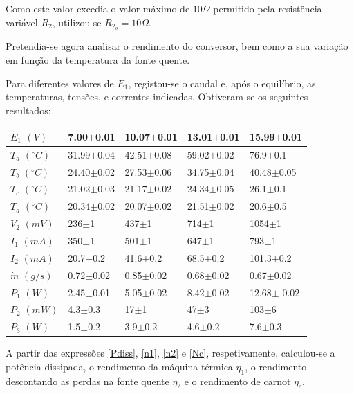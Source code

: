 \documentclass[9pt]{extarticle}
\begin{document}
\begin{multicols}{2}
\par Como este  valor excedia o valor máximo de $10\Omega$ permitido pela resistência variável $R_2$, utilizou-se $R_{2_o}=10\Omega$. 

\par Pretendia-se agora analisar o rendimento do conversor, bem como a sua variação em função da temperatura da fonte quente.

\par Para diferentes valores de $E_1$, registou-se o caudal e, após o equilíbrio, as temperaturas, tensões, e correntes indicadas. Obtiveram-se os seguintes resultados:

{\footnotesize
\begin{center}
\begin{tabular}{ x{1.2cm} x{1.4cm} x{1.4cm} x{1.4cm} x{1.5cm} }
$E_1$ $(V)$ & 7.00$\pm$0.01 & 10.07$\pm$0.01 & 13.01$\pm$0.01 & 15.99$\pm$0.01 \tabularnewline
\hline \hline
$T_a$ $(^\circ C)$ & 31.99$\pm$0.04 & 42.51$\pm$0.08 & 59.02$\pm$0.02 & 76.9$\pm$0.1 \tabularnewline
$T_b$ $(^\circ C)$ & 24.40$\pm$0.02 & 27.53$\pm$0.06 & 34.75$\pm$0.04 & 40.48$\pm$0.05 \tabularnewline
$T_c$ $(^\circ C)$ & 21.02$\pm$0.03 & 21.17$\pm$0.02 & 24.34$\pm$0.05 & 26.1$\pm$0.1 \tabularnewline
$T_d$ $(^\circ C)$ & 20.34$\pm$0.02 & 20.07$\pm$0.02 & 21.51$\pm$0.02 & 20.6$\pm$0.5 \tabularnewline
$V_2$ $(mV)$ & 236$\pm$1 & 437$\pm$1 & 714$\pm$1 & 1054$\pm$1  \tabularnewline
$I_1$ $(mA)$ & 350$\pm$1 & 501$\pm$1 & 647$\pm$1 & 793$\pm$1  \tabularnewline
$I_2$ $(mA)$ & 20.7$\pm$0.2 & 41.6$\pm$0.2 & 68.5$\pm$0.2 & 101.3$\pm$0.2  \tabularnewline
{\tiny $\dot{m}$ $(g/s)$} & 0.72$\pm$0.02 & 0.85$\pm$0.02 & 0.68$\pm$0.02 & 0.67$\pm$0.02 \tabularnewline
$P_1$ $(W)$ & 2.45$\pm$0.01 & 5.05$\pm$0.02 & 8.42$\pm$0.02 & 12.68$\pm$ 0.02 \tabularnewline
$P_2$ $(mW)$ & 4.3$\pm$0.3 & 17$\pm$1 & 47$\pm$3 & 103$\pm$6 \tabularnewline
$P_3$ $(W)$ & 1.5$\pm$0.2 & 3.9$\pm$0.2 & 4.6$\pm$0.2 & 7.6$\pm$0.3 \tabularnewline
\end{tabular}
\par{}
\end{center}
}

\par A partir das expressões \eqref{Pdiss}, \eqref{n1}, \eqref{n2} e \eqref{Nc}, respetivamente, calculou-se a potência dissipada, o rendimento da máquina térmica $\eta_1$, o rendimento descontando as perdas na fonte quente $\eta_2$ e o rendimento de carnot $\eta_c$.


\end{multicols}
\end{document}
